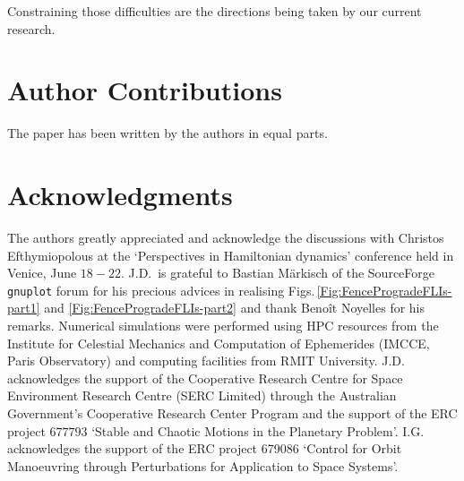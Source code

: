 \documentclass{amsart}
\theoremstyle{definition}
\theoremstyle{remark}
\numberwithin{equation}{section}
\begin{document}
Constraining those difficulties are the directions being taken by our current research. 






\section*{Author Contributions}
The paper has been written by the authors in equal parts.

\section*{Acknowledgments}
The authors greatly appreciated and acknowledge the discussions with Christos Efthymiopolous at the `Perspectives in Hamiltonian dynamics' conference held in Venice, June $18-22$. J.D.\, is grateful to Bastian M\"arkisch of the SourceForge \texttt{gnuplot} forum for his precious advices  in realising Figs.\,\ref{Fig:FenceProgradeFLIs-part1} and \ref{Fig:FenceProgradeFLIs-part2} and thank Beno\^it Noyelles for his remarks.  Numerical simulations were performed using HPC resources from the Institute for Celestial Mechanics and Computation of Ephemerides (IMCCE, Paris Observatory) and computing facilities from RMIT University. J.D.\, acknowledges the support of the Cooperative Research Centre for Space Environment Research Centre (SERC Limited) through the Australian Government's Cooperative Research Center Program and the support of the ERC project $677793$ `Stable and Chaotic Motions in the Planetary Problem'. I.G.\,acknowledges the support of the ERC project 679086 `Control for Orbit Manoeuvring through Perturbations for Application to Space Systems'.



\end{document}
